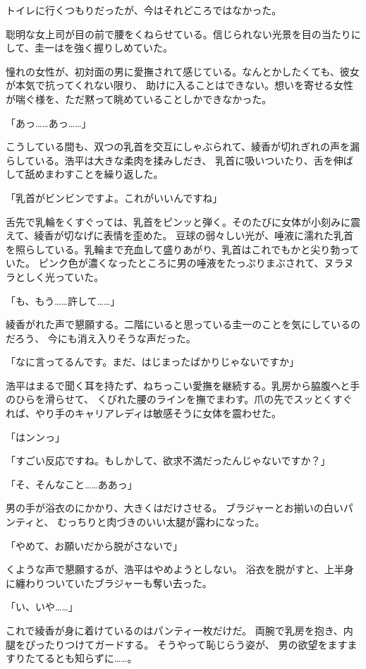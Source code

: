 ﻿\documentclass[
    book,tate,
    line_length=30zw,
    jafontsize=12pt,
    paper=b5j,
    landscape,
    ]{jlreq}
\begin{document}
トイレに行くつもりだったが、今はそれどころではなかった。

聡明な女上司が目の前で腰をくねらせている。信じられない光景を目の当たりにして、圭一はを強く握りしめていた。

憧れの女性が、初対面の男に愛撫されて感じている。なんとかしたくても、彼女が本気で抗ってくれない限り、
助けに入ることはできない。想いを寄せる女性が喘ぐ様を、ただ黙って眺めていることしかできなかった。

「あっ……あっ……」

こうしている間も、双つの乳首を交互にしゃぶられて、綾香が切れぎれの声を漏らしている。浩平は大きな柔肉を揉みしだき、
乳首に吸いついたり、舌を伸ばして舐めまわすことを繰り返した。

「乳首がビンビンですよ。これがいいんですね」

舌先で乳輪をくすぐっては、乳首をピンッと弾く。そのたびに女体が小刻みに震えて、綾香が切なげに表情を歪めた。
豆球の弱々しい光が、唾液に濡れた乳首を照らしている。乳輪まで充血して盛りあがり、乳首はこれでもかと尖り勃っていた。
ピンク色が濃くなったところに男の唾液をたっぷりまぶされて、ヌラヌラとしく光っていた。

「も、もう……許して……」

綾香がれた声で懇願する。二階にいると思っている圭一のことを気にしているのだろう、
今にも消え入りそうな声だった。

「なに言ってるんです。まだ、はじまったばかりじゃないですか」

浩平はまるで聞く耳を持たず、ねちっこい愛撫を継続する。乳房から脇腹へと手のひらを滑らせて、
くびれた腰のラインを撫でまわす。爪の先でスッとくすぐれば、やり手のキャリアレディは敏感そうに女体を震わせた。

「はンンっ」

「すごい反応ですね。もしかして、欲求不満だったんじゃないですか？」

「そ、そんなこと……ああっ」

男の手が浴衣のにかかり、大きくはだけさせる。 ブラジャーとお揃いの白いパンティと、
むっちりと肉づきのいい太腿が露わになった。

「やめて、お願いだから脱がさないで」

くような声で懇願するが、浩平はやめようとしない。 
浴衣を脱がすと、上半身に纏わりついていたブラジャーも奪い去った。

「い、いや……」

これで綾香が身に着けているのはパンティ一枚だけだ。 両腕で乳房を抱き、内腿をぴったりつけてガードする。
そうやって恥じらう姿が、 男の欲望をますますりたてるとも知らずに……。
\end{document}
